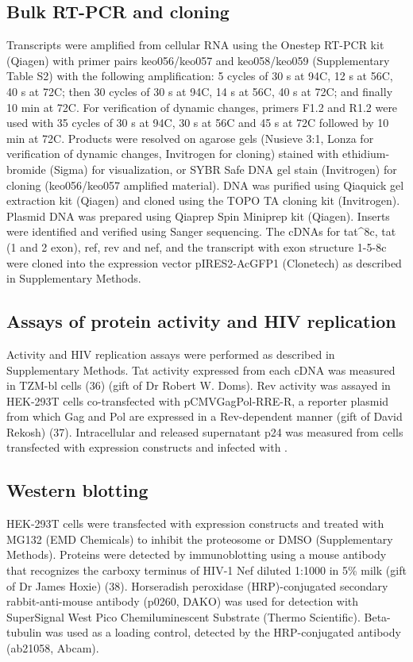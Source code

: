\documentclass[../sherrill-Mix_thesis.tex]{subfiles}
\begin{document}
\subsection{Bulk RT-PCR and cloning}
Transcripts were amplified from cellular RNA using the Onestep RT-PCR kit (Qiagen) with primer pairs keo056/keo057 and keo058/keo059 (Supplementary Table S2) with the following amplification: 5 cycles of 30 s at 94\degree{}C, 12 s at 56\degree{}C, 40 s at 72\degree{}C; then 30 cycles of 30 s at 94\degree{}C, 14 s at 56\degree{}C, 40 s at 72\degree{}C; and finally 10 min at 72\degree{}C. For verification of dynamic changes, primers F1.2 and R1.2 were used with 35 cycles of 30 s at 94\degree{}C, 30 s at 56\degree{}C and 45 s at 72\degree{}C followed by 10 min at 72\degree{}C. Products were resolved on agarose gels (Nusieve 3:1, Lonza for verification of dynamic changes, Invitrogen for cloning) stained with ethidium-bromide (Sigma) for visualization, or SYBR Safe DNA gel stain (Invitrogen) for cloning (keo056/keo057 amplified material). DNA was purified using Qiaquick gel extraction kit (Qiagen) and cloned using the TOPO TA cloning kit (Invitrogen). Plasmid DNA was prepared using Qiaprep Spin Miniprep kit (Qiagen). Inserts were identified and verified using Sanger sequencing. The cDNAs for tat\^{}8c, tat (1 and 2 exon), ref, rev and nef, and the transcript with exon structure 1-5-8c were cloned into the expression vector pIRES2-AcGFP1 (Clonetech) as described in Supplementary Methods. 

\subsection{Assays of protein activity and HIV replication}
Activity and HIV replication assays were performed as described in Supplementary Methods. Tat activity expressed from each cDNA was measured in TZM-bl cells (36) (gift of Dr Robert W. Doms). Rev activity was assayed in HEK-293T cells co-transfected with pCMVGagPol-RRE-R, a reporter plasmid from which Gag and Pol are expressed in a Rev-dependent manner (gift of David Rekosh) (37). Intracellular and released supernatant p24 was measured from cells transfected with expression constructs and infected with \hivEight{}.

\subsection{Western blotting}
HEK-293T cells were transfected with expression constructs and treated with MG132 (EMD Chemicals) to inhibit the proteosome or DMSO (Supplementary Methods). Proteins were detected by immunoblotting using a mouse antibody that recognizes the carboxy terminus of HIV-1 Nef diluted 1:1000 in 5\% milk (gift of Dr James Hoxie) (38). Horseradish peroxidase (HRP)-conjugated secondary rabbit-anti-mouse antibody (p0260, DAKO) was used for detection with SuperSignal West Pico Chemiluminescent Substrate (Thermo Scientific). Beta-tubulin was used as a loading control, detected by the HRP-conjugated antibody (ab21058, Abcam). 
\end{document}
